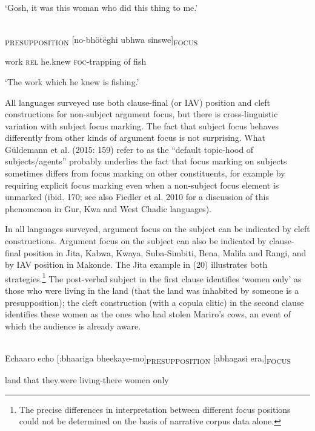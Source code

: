 \documentclass[output=paper]{langsci/langscibook}
\begin{document}
\begin{styleLangSciTranslation}
\begin{styleLangSciTranslation}\upshape
‘Gosh, it was this woman who did this thing to me.’
\z

\ea\label{ex:}
\\
\textsubscript{PRESUPPOSITION} [no-bhötëghi ubhwa sinswe]\textsubscript{FOCUS}\\
\begin{styleUntitledi}
work \textsc{rel }he.knew \textsc{foc}{}-trapping of fish
\end{styleUntitledi}

\begin{styleLangSciTranslation}\upshape
‘The work which he knew is fishing.’
\z

All languages surveyed use both clause-final (or IAV) position and cleft constructions for non-subject argument focus, but there is cross-linguistic variation with subject focus marking. The fact that subject focus behaves differently from other kinds of argument focus is not surprising. What Güldemann et al. (2015: 159) refer to as the “default topic-hood of subjects/agents” probably underlies the fact that focus marking on subjects sometimes differs from focus marking on other constituents, for example by requiring explicit focus marking even when a non-subject focus element is unmarked (ibid. 170; see also Fiedler et al. 2010 for a discussion of this phenomenon in Gur, Kwa and West Chadic languages).

In all languages surveyed, argument focus on the subject can be indicated by cleft constructions. Argument focus on the subject can also be indicated by clause-final position in Jita, Kabwa, Kwaya, Suba-Simbiti, Bena, Malila and Rangi, and by IAV position in Makonde. The Jita example in (20) illustrates both strategies.\footnote{The precise differences in interpretation between different focus positions could not be determined on the basis of narrative corpus data alone.} The post-verbal subject in the first clause identifies ‘women only’ as those who were living in the land (that the land was inhabited by someone is a presupposition); the cleft construction (with a copula clitic) in the second clause identifies these women as the ones who had stolen Mariro’s cows, an event of which the audience is already aware.

\ea\label{ex:}
\\
\gll Echaaro echo [:bhaariga bheekaye-mo]\textsubscript{PRESUPPOSITION} [abhagasi era,]\textsubscript{FOCUS}\\
\begin{styleUntitledi}
land that they.were living-there women only
\end{styleUntitledi}


\end{styleLangSciTranslation}
\end{styleLangSciTranslation}
\end{styleLangSciTranslation}
\end{document}
